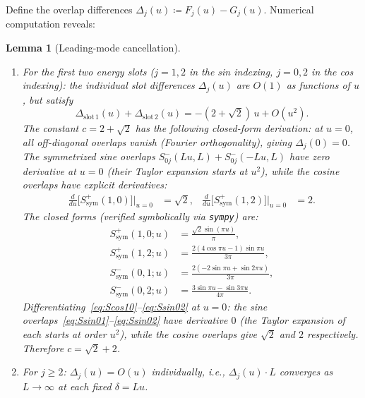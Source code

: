 \documentclass[12pt,a4paper]{article}
\newtheorem{lemma}[theorem]{Lemma}
\theoremstyle{definition}
\theoremstyle{remark}
\begin{document}
Define the overlap differences $\Delta_j(u) \coloneqq F_j(u) - G_j(u)$. Numerical computation reveals:

\begin{lemma}[Leading-mode cancellation]
\label{lem:leading-cancel}
\begin{enumerate}[label=\textup{(\alph*)}]
  \item For the first two energy slots ($j = 1, 2$ in the sin indexing, $j = 0, 2$ in the cos indexing): the individual slot differences $\Delta_j(u)$ are $O(1)$ as functions of $u$, but satisfy
  \begin{equation}
  \label{eq:pairwise-cancel}
    \Delta_{\mathrm{slot\,1}}(u) + \Delta_{\mathrm{slot\,2}}(u) = -(2 + \sqrt{2})\,u + O(u^2).
  \end{equation}
  The constant $c = 2 + \sqrt{2}$ has the following closed-form derivation: at $u = 0$, all off-diagonal overlaps vanish (Fourier orthogonality), giving $\Delta_j(0) = 0$. The symmetrized sine overlaps $S^-_{0j}(Lu, L) + S^-_{0j}(-Lu, L)$ have \emph{zero derivative} at $u = 0$ (their Taylor expansion starts at $u^2$), while the cosine overlaps have explicit derivatives:
  \begin{align*}
    \frac{d}{du}\bigl[S^+_{\mathrm{sym}}(1, 0)\bigr]\Big|_{u=0} &= \sqrt{2}, &
    \frac{d}{du}\bigl[S^+_{\mathrm{sym}}(1, 2)\bigr]\Big|_{u=0} &= 2.
  \end{align*}
  The closed forms (verified symbolically via \texttt{sympy}) are:
  \begin{align}
    S^+_{\mathrm{sym}}(1,0;u) &= \frac{\sqrt{2}\sin(\pi u)}{\pi}, \label{eq:Scos10} \\
    S^+_{\mathrm{sym}}(1,2;u) &= \frac{2(4\cos\pi u - 1)\sin\pi u}{3\pi}, \label{eq:Scos12} \\
    S^-_{\mathrm{sym}}(0,1;u) &= \frac{2(-2\sin\pi u + \sin 2\pi u)}{3\pi}, \label{eq:Ssin01} \\
    S^-_{\mathrm{sym}}(0,2;u) &= \frac{3\sin\pi u - \sin 3\pi u}{4\pi}. \label{eq:Ssin02}
  \end{align}
  Differentiating~\eqref{eq:Scos10}--\eqref{eq:Ssin02} at $u = 0$: the sine overlaps~\eqref{eq:Ssin01}--\eqref{eq:Ssin02} have derivative $0$ (the Taylor expansion of each starts at order $u^2$), while the cosine overlaps give $\sqrt{2}$ and $2$ respectively. Therefore $c = \sqrt{2} + 2$.
  \item For $j \geq 2$: $\Delta_j(u) = O(u)$ individually, i.e., $\Delta_j(u) \cdot L$ converges as $L \to \infty$ at each fixed $\delta = Lu$.
\end{enumerate}
\end{lemma}
\end{document}

